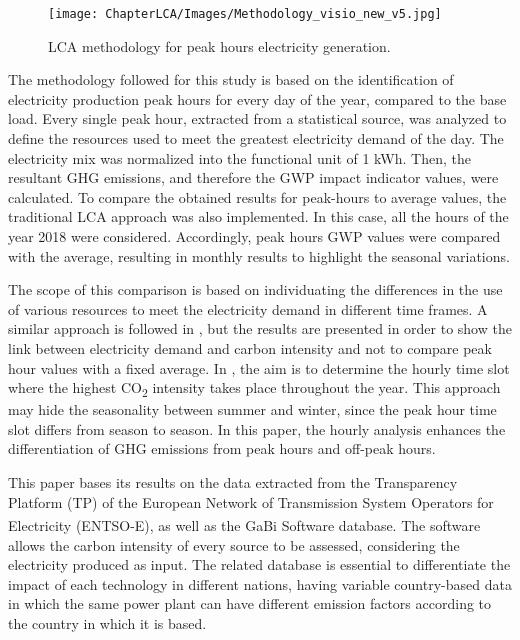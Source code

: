 {\begin{figure}[htbp]
	\centering
	\texttt{[image: ChapterLCA/Images/Methodology\_visio\_new\_v5.jpg]}
		\caption{LCA methodology for peak hours electricity generation.}%
	\label{Methodology}
\end{figure}


{The methodology followed for this study is based on the identification of electricity production peak hours for every day of the year, compared to the base load.} Every single peak hour, {extracted from a statistical source}, was analyzed to define the resources used to meet the greatest electricity demand of the day. The electricity mix was normalized into the functional unit of 1 kWh. Then, the resultant GHG emissions, and therefore the GWP impact indicator values, were calculated. To compare the obtained results for peak-hours to average values, the traditional LCA approach was also implemented. In this case, all the hours of the year 2018 were considered. Accordingly, peak hours GWP values were compared with the average, resulting in monthly results to highlight the seasonal variations. 

{The scope of this comparison is based on individuating the differences in the use of various resources to meet the electricity demand in different time frames}.  A similar approach is followed in \cite{Khan2018, Khan2018AnalysisIntensity, Cubi2015IncorporationAssessment}, but the results are presented in order to show the link between electricity demand and carbon intensity and not to compare peak hour values with a fixed average. In \cite{Nilsson2017AssessingEmissions}, the aim is to determine the hourly time slot where the highest CO\textsubscript2 intensity takes place throughout the year. This approach may hide the seasonality between summer and winter, since the peak hour time slot differs from season to season. In this paper, the hourly analysis enhances the differentiation of GHG emissions from peak hours and off-peak hours. 

This paper bases its results on the data extracted from the Transparency Platform (TP) of the European Network of Transmission System Operators for Electricity (ENTSO-E), as well as the GaBi\textsuperscript{\textregistered} Software database. {The software allows the carbon intensity of every source to be assessed, considering the electricity produced as input. The related database is essential to differentiate the impact of each technology in different nations, having variable country-based data in which the same power plant can have different emission factors according to the country in which it is based}.
 
}
